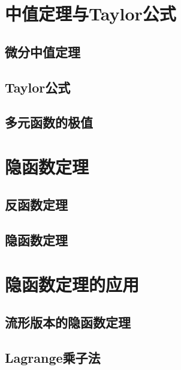 \newpage
\section{中值定理与Taylor公式}

\subsection{微分中值定理}

\subsection{Taylor公式}

\subsection{多元函数的极值}

\newpage
\section{隐函数定理}

\subsection{反函数定理}

\subsection{隐函数定理}


\newpage
\section{隐函数定理的应用}

\subsection{流形版本的隐函数定理}

\subsection{Lagrange乘子法}